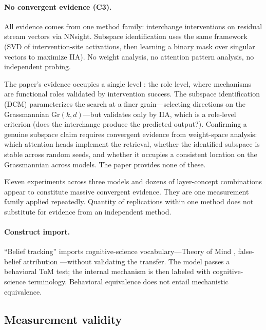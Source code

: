 \documentclass[11pt]{article}
\begin{document}
\paragraph{No convergent evidence (C3).}
All evidence comes from one method family: interchange interventions on residual stream vectors via NNsight. Subspace identification uses the same framework (SVD of intervention-site activations, then learning a binary mask over singular vectors to maximize IIA). No weight analysis, no attention pattern analysis, no independent probing.

The paper's evidence occupies a single level \citep{tower2026mechviews}: the role level, where mechanisms are functional roles validated by intervention success. The subspace identification (DCM) parameterizes the search at a finer grain---selecting directions on the Grassmannian $\text{Gr}(k, d)$---but validates only by IIA, which is a role-level criterion (does the interchange produce the predicted output?). Confirming a genuine subspace claim requires convergent evidence from weight-space analysis: which attention heads implement the retrieval, whether the identified subspace is stable across random seeds, and whether it occupies a consistent location on the Grassmannian across models. The paper provides none of these.

Eleven experiments across three models and dozens of layer-concept combinations appear to constitute massive convergent evidence. They are one measurement family applied repeatedly. Quantity of replications within one method does not substitute for evidence from an independent method.

\paragraph{Construct import.}
``Belief tracking'' imports cognitive-science vocabulary---Theory of Mind \citep{premack1978chimpanzee}, false-belief attribution \citep{wimmer1983beliefs}---without validating the transfer. The model passes a behavioral ToM test; the internal mechanism is then labeled with cognitive-science terminology. Behavioral equivalence does not entail mechanistic equivalence.

\subsection{Measurement validity}
\end{document}
